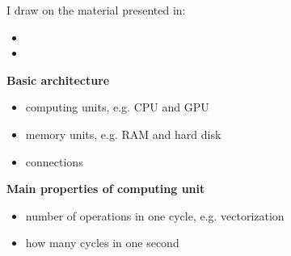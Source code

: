 \begin{frame} I draw on the material presented in:\vspace{0.3cm}

\begin{itemize}\setlength\itemsep{1em}
  \item {}
  \item {}
\end{itemize}
\end{frame}
\begin{frame}\textbf{Basic architecture}\vspace{0.3cm}

\begin{itemize}\setlength\itemsep{1em}
    \item computing units, e.g. CPU and GPU
    \item memory units, e.g. RAM and hard disk
    \item connections
\end{itemize}

\end{frame}
\begin{frame}\textbf{Main properties of computing unit}\vspace{0.3cm}

\begin{itemize}\setlength\itemsep{1em}
    \item number of operations in one cycle, e.g. vectorization
    \item how many cycles in one second
\end{itemize}

\end{frame}
\begin{frame}
	\begin{figure}[htp]\centering
	\end{figure}
\end{frame}
